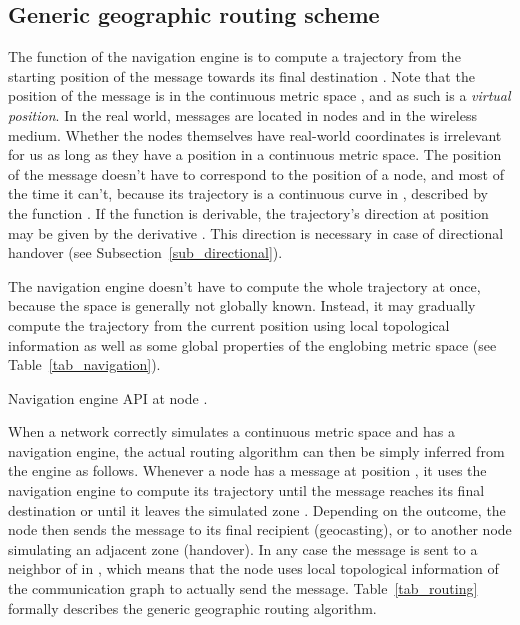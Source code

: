 \documentclass{article}
\begin{document}
\subsection{Generic geographic routing scheme}
\label{sub_scheme}
The function of the navigation engine is to compute a trajectory from the starting position  of the message towards its final destination . Note that the position of the message is in the continuous metric space , and as such is a {\em virtual position}. In the real world, messages are located in nodes and in the wireless medium. Whether the nodes themselves have real-world coordinates is irrelevant for us as long as they have a position in a continuous metric space. The position  of the message doesn't have to correspond to the position of a node, and most of the time it can't, because its trajectory is a continuous curve in , described by the function . If the function  is derivable, the trajectory's direction at position  may be given by the derivative . This direction is necessary in case of directional handover (see Subsection~\ref{sub_directional}).

The navigation engine doesn't have to compute the whole trajectory at once, because the space  is generally not globally known. Instead, it may gradually compute the trajectory from the current position  using local topological information as well as some global properties of the englobing metric space  (see Table~\ref{tab_navigation}).

\begin{table}[h]
\begin{center}
\end{center}
\caption{Navigation engine API at node .}
\label{tab_navigation}
\end{table}

When a network correctly simulates a continuous metric space  and has a navigation engine, the actual routing algorithm can then be simply inferred from the engine as follows. Whenever a node  has a message at position , it uses the navigation engine to compute its trajectory until the message reaches its final destination or until it leaves the simulated zone . Depending on the outcome, the node then sends the message to its final recipient (geocasting), or to another node simulating an adjacent zone (handover). In any case the message is sent to a neighbor  of  in , which means that the node  uses local topological information of the communication graph  to actually send the message. Table~\ref{tab_routing} formally describes the generic geographic routing algorithm.
\end{document}
